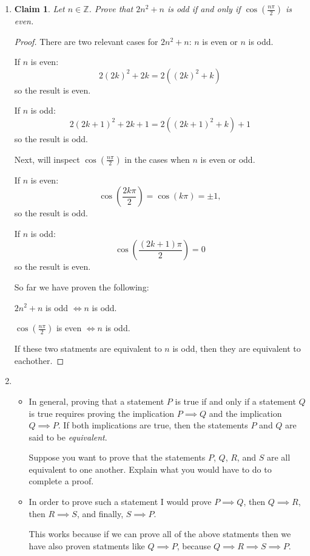 \documentclass[12pt,a4paper,reqno,parskip=full]{amsart}
\numberwithin{equation}{section}
\theoremstyle{plain}
\newtheorem{claim}[subsection]{Claim}
\theoremstyle{definition}
\begin{document}
\begin{enumerate}
  \item {
        \begin{claim}
          Let $n\in\mathbb{Z}$. Prove that $2n^2+n$ is odd if and only if $\cos\left(\frac{n\pi}{2}\right)$ is even.
        \end{claim}

        \begin{proof}
          There are two relevant cases for $2n^2+n$: $n$ is even or $n$ is odd.

          If $n$ is even: \[2(2k)^2 + 2k = 2((2k)^2 + k)\] so the result is even.

          If $n$ is odd:
          \[
            2(2k + 1)^2 + 2k + 1 = 2((2k + 1)^2 + k) + 1
          \]
          so the result is odd.

          Next, will inspect $\cos\left(\frac{n\pi}{2}\right)$ in the cases when $n$ is even or odd.

          If $n$ is even:
          \[
            \cos\left(\frac{2k\pi}{2}\right) = \cos\left(k\pi\right) = \pm 1,
          \]
          so the result is odd.

          If $n$ is odd:
          \[
            \cos\left(\frac{(2k + 1)\pi}{2}\right) = 0
          \]
          so the result is even.

          
          So far we have proven the following:

          $2n^2+n$ is odd $\iff n$ is odd.

          $\cos\left(\frac{n\pi}{2}\right)$ is even $\iff n$ is odd.

          If these two statments are equivalent to $n$ is odd, then they are equivalent to eachother.
        \end{proof}}

  \item {
        \begin{itemize}
          \item {
                In general, proving that a statement $P$ is true if and only if a statement $Q$  is true requires proving the implication $P\implies Q$ and the implication $Q\implies P$. If both implications are true, then the statements $P$ and $Q$ are said to be \textit{equivalent}.

                Suppose you want to prove that the statements $P$, $Q$, $R$, and $S$ are all equivalent to one another. Explain what you would have to do to complete a proof.}

          \item {
                In order to prove such a statement I would prove $P \implies Q$, then $Q \implies R$, then $R \implies S$, and finally, $S \implies P$.

                This works because if we can prove all of the above statments then we have also proven statments like $Q \implies P$, because $ Q \implies R \implies S \implies P$.
                }
        \end{itemize}
        }

\end{enumerate}
\end{document}
